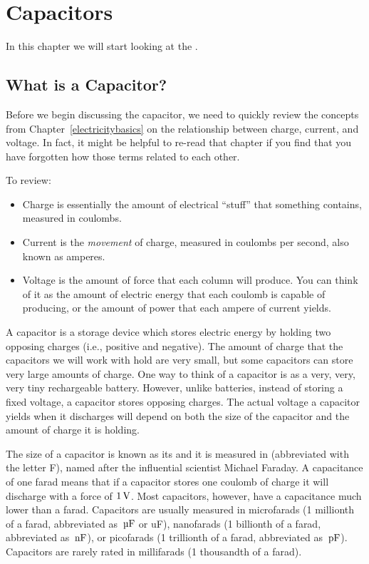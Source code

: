 \chapter{Capacitors}
\label{chapCapacitors}

In this chapter we will start looking at the . 

\section{What is a Capacitor?}

Before we begin discussing the capacitor, we need to quickly review the concepts from Chapter~\ref{electricitybasics} on the relationship between charge, current, and voltage.
In fact, it might be helpful to re-read that chapter if you find that you have forgotten how those terms related to each other.

To review:

\begin{itemize}
\item Charge is essentially the amount of electrical ``stuff'' that something contains, measured in coulombs.
\item Current is the \emph{movement} of charge, measured in coulombs per second, also known as amperes.
\item Voltage is the amount of force that each column will produce.  You can think of it as the amount of electric energy that each coulomb is capable of producing, or the amount of power that each ampere of current yields.  
\end{itemize}

A capacitor is a storage device which stores electric energy by holding two opposing charges (i.e., positive and negative).  
The amount of charge that the capacitors we will work with hold are very small, but some capacitors can store very large amounts of charge.
One way to think of a capacitor is as a very, very, very tiny rechargeable battery.
However, unlike batteries, instead of storing a fixed voltage, a capacitor stores opposing charges.
The actual voltage a capacitor yields when it discharges will depend on both the size of the capacitor and the amount of charge it is holding.

The size of a capacitor is known as its  and it is measured in  (abbreviated with the letter F), named after the influential scientist Michael Faraday.
A capacitance of one farad means that if a capacitor stores one coulomb of charge it will discharge with a force of $1\,\si{\volt}$.
Most capacitors, however, have a capacitance much lower than a farad.
Capacitors are usually measured in microfarads (1 millionth of a farad, abbreviated as $\,\si{\micro\farad}$ or uF), nanofarads (1 billionth of a farad, abbreviated as $\,\si{\nano\farad}$), or picofarads (1 trillionth of a farad, abbreviated as $\mypf$).  
Capacitors are rarely rated in millifarads (1 thousandth of a farad).

